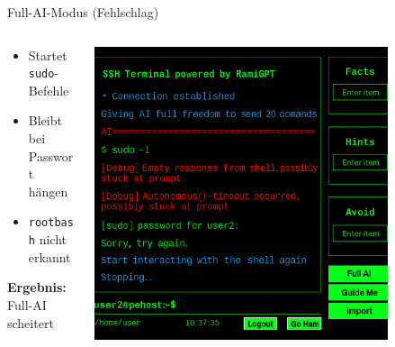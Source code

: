 \documentclass[
	aspectratio=169,	%
	onlytextwidth,		%
	t,					%
	]{beamer}
\begin{document}
\begin{frame}{Full-AI-Modus (Fehlschlag)}
	\begin{columns}
		\begin{column}[T]{.45\textwidth}
			\begin{itemize}
				\item Startet \texttt{sudo}-Befehle
				\item Bleibt bei Passwort hängen
				\item \texttt{rootbash} nicht erkannt
			\end{itemize}
			\textbf{Ergebnis:} Full-AI scheitert
		\end{column}
	\begin{column}[T]{.55\textwidth}
		\centering
		\vspace{-7mm}
		\includegraphics[width=0.8\textwidth]{figures/6.png}
		\label{fig:6}
		\end{column}
	\end{columns}
\end{frame}
\end{document}
